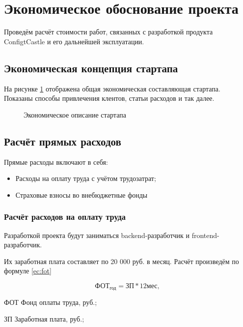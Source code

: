 \section{Экономическое обоснование проекта}

Проведём расчёт стоимости работ, связанных с разработкой
продукта ConfigtCastle и его дальнейшей эксплуатации.

\tocless\subsection{Экономическая концепция стартапа}

На рисунке \ref{ec:canvas} отображена общая экономическая составляющая стартапа.
Показаны способы привлечения клентов, статьи расходов и так далее.

\begin{figure}[H]
    \caption{Экономическое описание стартапа}
    \label{ec:canvas}
\end{figure}

\tocless\subsection{Расчёт прямых расходов}

Прямые расходы включают в себя:
\begin{itemize}
    \item Расходы на оплату труда с учётом трудозатрат;
    \item Страховые взносы во внебюджетные фонды
\end{itemize}

\subsubsection{Расчёт расходов на оплату труда}

Разработкой проекта будут заниматься backend-разработчик и
frontend-разработчик.

Их заработная плата составляет по 20 000 руб. в месяц. Расчёт произведём по формуле \ref{ec:fot}

\begin{equation}
    \label{ec:fot}
   \text{ФОТ}_\text{год} = \text{ЗП} * 12 \text{мес},
\end{equation}

\begin{eqexpl}[5ex]
    \item{ФОТ} Фонд оплаты труда, руб.;
    \item{ЗП} Заработная плата, руб.;
\end{eqexpl}


